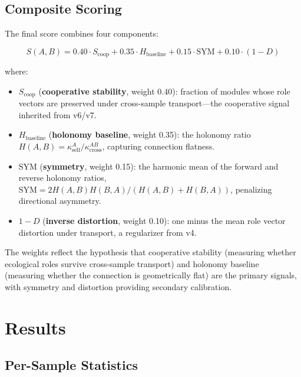 \documentclass{../yalumba}
\begin{document}
\subsection{Composite Scoring}
\label{sec:composite}

The final score combines four components:

\begin{equation}
  S(A, B) = 0.40 \cdot S_{\text{coop}}
           + 0.35 \cdot H_{\text{baseline}}
           + 0.15 \cdot \text{SYM}
           + 0.10 \cdot (1 - D)
  \label{eq:composite}
\end{equation}

where:
\begin{itemize}
  \item $S_{\text{coop}}$ (\textbf{cooperative stability}, weight 0.40):
    fraction of modules whose role vectors are preserved under cross-sample
    transport---the cooperative signal inherited from v6/v7.
  \item $H_{\text{baseline}}$ (\textbf{holonomy baseline}, weight 0.35):
    the holonomy ratio $H(A, B) = \kappa_{\text{self}}^A /
    \kappa_{\text{cross}}^{AB}$, capturing connection flatness.
  \item $\text{SYM}$ (\textbf{symmetry}, weight 0.15): the harmonic mean
    of the forward and reverse holonomy ratios,
    $\text{SYM} = 2 H(A,B) H(B,A) / (H(A,B) + H(B,A))$, penalizing
    directional asymmetry.
  \item $1 - D$ (\textbf{inverse distortion}, weight 0.10): one minus the
    mean role vector distortion under transport, a regularizer from v4.
\end{itemize}

The weights reflect the hypothesis that cooperative stability (measuring
whether ecological roles survive cross-sample transport) and holonomy
baseline (measuring whether the connection is geometrically flat) are the
primary signals, with symmetry and distortion providing secondary
calibration.


\section{Results}
\label{sec:results}

\subsection{Per-Sample Statistics}
\end{document}
